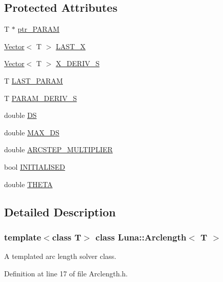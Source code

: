 \subsection*{Protected Attributes}
\begin{DoxyCompactItemize}
\item 
T $\ast$ \hyperlink{classLuna_1_1Arclength_a984cead721a38abf1ab2a489052461e0}{ptr\+\_\+\+P\+A\+R\+AM}
\item 
\hyperlink{classLuna_1_1Vector}{Vector}$<$ T $>$ \hyperlink{classLuna_1_1Arclength_a6d6ba83245b4dd616d265609a93035a2}{L\+A\+S\+T\+\_\+X}
\item 
\hyperlink{classLuna_1_1Vector}{Vector}$<$ T $>$ \hyperlink{classLuna_1_1Arclength_a0108e51178f63927883af0b0022c29ad}{X\+\_\+\+D\+E\+R\+I\+V\+\_\+S}
\item 
T \hyperlink{classLuna_1_1Arclength_a98e8241f24a16ea9f12e514d8d8f841b}{L\+A\+S\+T\+\_\+\+P\+A\+R\+AM}
\item 
T \hyperlink{classLuna_1_1Arclength_a5a02856595774b4a96e4d8add5d9baa4}{P\+A\+R\+A\+M\+\_\+\+D\+E\+R\+I\+V\+\_\+S}
\item 
double \hyperlink{classLuna_1_1Arclength_a6797d7b76d3e27c00b9c4c6ab9970405}{DS}
\item 
double \hyperlink{classLuna_1_1Arclength_a8fcd2b977d7ce78342f113d4e69ad8f1}{M\+A\+X\+\_\+\+DS}
\item 
double \hyperlink{classLuna_1_1Arclength_ae1ff8d41d3e81d9ce335d19de4a269cc}{A\+R\+C\+S\+T\+E\+P\+\_\+\+M\+U\+L\+T\+I\+P\+L\+I\+ER}
\item 
bool \hyperlink{classLuna_1_1Arclength_a9bf5e636e7a0772f3ba5476ec2c83f6a}{I\+N\+I\+T\+I\+A\+L\+I\+S\+ED}
\item 
double \hyperlink{classLuna_1_1Arclength_aa17766cf4bcbe5b063dc2a95f89baf42}{T\+H\+E\+TA}
\end{DoxyCompactItemize}


\subsection{Detailed Description}
\subsubsection*{template$<$class T$>$\newline
class Luna\+::\+Arclength$<$ T $>$}

A templated arc length solver class. 

Definition at line 17 of file Arclength.\+h.



